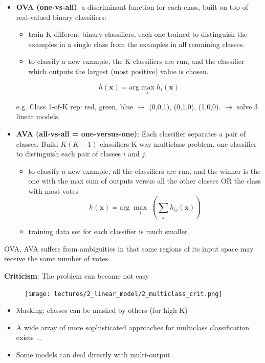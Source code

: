 \documentclass[../main.tex]{subfiles}
\begin{document}
\begin{itemize}
    \item \textbf{OVA (one-vs-all)}: a discriminant function for each class, built on top of real-valued binary classifiers:
    \begin{itemize}
        \item train K different binary classifiers, each one trained to distinguish the examples in a single class from the examples in all remaining classes.
        \item to classify a new example, the K classifiers are run, and the classifier which outputs the largest (most positive) value is chosen.
    \end{itemize}
        $$ h(\mathbf{x}) = \mbox{arg}\max_{i}h_i(\mathbf{x})$$ 

    e.g. Class 1-of-K rep: {red, green, blue} $\rightarrow$ (0,0,1), (0,1,0), (1,0,0). $\rightarrow$ solve 3 linear models.
    
    \item \textbf{AVA (all-vs-all = one-versus-one)}:
    Each classifier separates a pair of classes. Build $K(K-1)$ classifiers K-way multiclass problem, one classifier to distinguish each pair of classes $i$ and $j$.
    \begin{itemize}
        \item to classify a new example, all the classifiers are run, and the winner is the one with the
                max sum of outputs versus all the other classes OR the class with most votes
        $$ h(\mathbf{x}) = \mbox{arg}\;\max_{i} \; (\sum_{j}^{} h_{ij}(\mathbf{x}))$$ 
        \item training data set for each classifier is much smaller
    \end{itemize}
    
\end{itemize}
OVA, AVA suffers from ambiguities in that some regions of its input space may receive the same number of votes.

\noindent \textbf{Criticism}:
The problem can become not easy
\begin{figure}[H]
    \centering
    \texttt{[image: lectures/2\_linear\_model/2\_multiclass\_crit.png]}
\end{figure}

\begin{itemize}
    \item Masking: classes can be masked by others (for high K) 
    \item A wide array of more sophisticated approaches for
multiclass classification exists ...
    \item Some models can deal directly with multi-output
\end{itemize}
\end{document}

